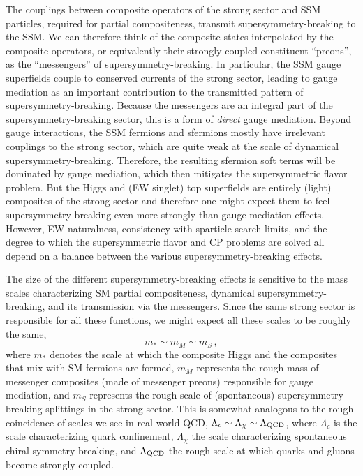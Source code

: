 \documentclass[a4paper,12pt]{article}
\def\mst{m_*}
\def\mS{m_S}
\begin{document}
The couplings between composite operators of the strong sector and SSM particles, required for partial compositeness, transmit supersymmetry-breaking to the SSM. We can therefore think of the composite states interpolated by the composite operators, or equivalently their strongly-coupled constituent ``preons'', as the ``messengers'' of supersymmetry-breaking. In particular, the SSM gauge superfields couple to conserved currents of the strong sector, leading to gauge mediation as an important contribution to the transmitted pattern of supersymmetry-breaking. Because the messengers are an integral part of the supersymmetry-breaking sector, this is a form of {\it direct} gauge mediation. Beyond gauge interactions, the SSM fermions and sfermions mostly have irrelevant couplings to the strong sector, which are quite  weak at the scale of dynamical supersymmetry-breaking. Therefore, the resulting sfermion  soft terms will be dominated by gauge mediation, which then mitigates the supersymmetric flavor problem. But the Higgs and (EW singlet) top superfields are entirely (light) composites of the strong sector and therefore one might expect them to feel supersymmetry-breaking even more strongly than gauge-mediation effects. However, EW naturalness, consistency with sparticle search limits, and the degree to which the supersymmetric flavor and CP problems are solved all depend on a balance between the various supersymmetry-breaking effects.

The size of the different supersymmetry-breaking effects is sensitive to the mass scales characterizing SM  partial compositeness, dynamical supersymmetry-breaking, and its transmission via the messengers.
Since the same strong sector is responsible for all these functions, we might expect all these scales to be roughly the same,
\begin{equation}
   \mst \sim m_M \sim \mS\, ,
\end{equation}
where $\mst$ denotes the scale at which the composite Higgs and the composites that mix with SM fermions are formed,
$m_M$ represents the rough mass of messenger composites (made of messenger preons) responsible for gauge mediation, and $\mS$ represents the rough scale of (spontaneous) supersymmetry-breaking splittings in the strong sector. This is somewhat analogous to the rough coincidence of scales we see in real-world QCD, $\Lambda_{c} \sim \Lambda_{\chi} \sim \Lambda_{\rm QCD}$, where $\Lambda_{c}$ is the scale characterizing quark confinement, $\Lambda_{\chi}$ the scale characterizing spontaneous chiral symmetry breaking, and $\Lambda_{\rm QCD}$ the rough scale at which quarks and gluons become strongly coupled.
\end{document}
